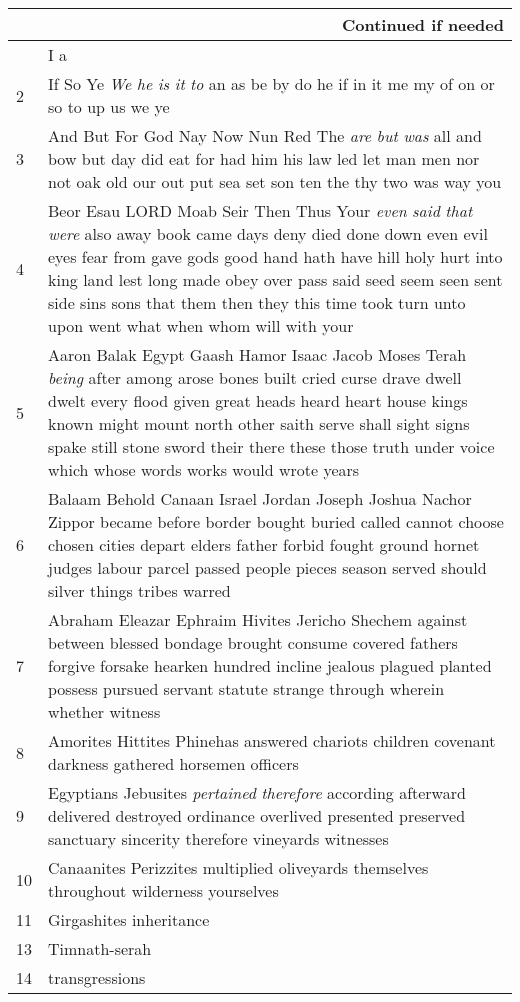 \begin{center}
\begin{longtable}{p{0.4in}|p{3.6in}}
\hline \multicolumn{2}{|r|}{{Continued if needed}} \\ \hline
\endfoot 
1 & I a \\ \hline
2 & If So Ye \emph{We} \emph{he} \emph{is} \emph{it} \emph{to} an as be by do he if in it me my of on or so to up us we ye \\ \hline
3 & And But For God Nay Now Nun Red The \emph{are} \emph{but} \emph{was} all and bow but day did eat for had him his law led let man men nor not oak old our out put sea set son ten the thy two was way you \\ \hline
4 & Beor Esau LORD Moab Seir Then Thus Your \emph{even} \emph{said} \emph{that} \emph{were} also away book came days deny died done down even evil eyes fear from gave gods good hand hath have hill holy hurt into king land lest long made obey over pass said seed seem seen sent side sins sons that them then they this time took turn unto upon went what when whom will with your \\ \hline
5 & Aaron Balak Egypt Gaash Hamor Isaac Jacob Moses Terah \emph{being} after among arose bones built cried curse drave dwell dwelt every flood given great heads heard heart house kings known might mount north other saith serve shall sight signs spake still stone sword their there these those truth under voice which whose words works would wrote years \\ \hline
6 & Balaam Behold Canaan Israel Jordan Joseph Joshua Nachor Zippor became before border bought buried called cannot choose chosen cities depart elders father forbid fought ground hornet judges labour parcel passed people pieces season served should silver things tribes warred \\ \hline
7 & Abraham Eleazar Ephraim Hivites Jericho Shechem against between blessed bondage brought consume covered fathers forgive forsake hearken hundred incline jealous plagued planted possess pursued servant statute strange through wherein whether witness \\ \hline
8 & Amorites Hittites Phinehas answered chariots children covenant darkness gathered horsemen officers \\ \hline
9 & Egyptians Jebusites \emph{pertained} \emph{therefore} according afterward delivered destroyed ordinance overlived presented preserved sanctuary sincerity therefore vineyards witnesses \\ \hline
10 & Canaanites Perizzites multiplied oliveyards themselves throughout wilderness yourselves \\ \hline
11 & Girgashites inheritance \\ \hline
13 & Timnath-serah \\ \hline
14 & transgressions \\ \hline



\end{longtable}
\end{center}
 
